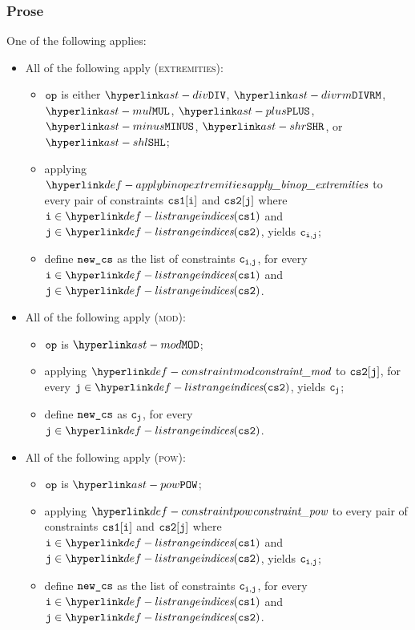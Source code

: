 \subsubsection{Prose}
One of the following applies:
\begin{itemize}
  \item All of the following apply (\textsc{extremities}):
  \begin{itemize}
    \item $\texttt{op}$ is either $\DIV$, $\DIVRM$, $\MUL$, $\PLUS$, $\MINUS$, $\SHR$, or $\SHL$;
    \item applying $\applybinopextremities$ to every pair of constraints $\texttt{cs1}[\texttt{i}]$ and $\texttt{cs2}[\texttt{j}]$
          where $\vi\in\listrange(\csone)$ and $\vj\in\listrange(\cstwo)$, yields $\texttt{c}_{\texttt{i},\texttt{j}}$;
    \item define $\texttt{new\_cs}$ as the list of constraints $\texttt{c}_{\texttt{i},\texttt{j}}$, for every
          $\vi\in\listrange(\csone)$ and $\vj\in\listrange(\cstwo)$.
  \end{itemize}

  \item All of the following apply (\textsc{mod}):
  \begin{itemize}
    \item $\texttt{op}$ is $\MOD$;
    \item applying $\constraintmod$ to $\texttt{cs2}[\texttt{j}]$, for every $\vj\in\listrange(\cstwo)$, yields $\texttt{c}_{\texttt{j}}$;
    \item define $\texttt{new\_cs}$ as $\texttt{c}_{\texttt{j}}$, for every $\vj\in\listrange(\cstwo)$.
  \end{itemize}

  \item All of the following apply (\textsc{pow}):
  \begin{itemize}
    \item $\texttt{op}$ is $\POW$;
    \item applying $\constraintpow$ to every pair of constraints $\texttt{cs1}[\texttt{i}]$ and $\texttt{cs2}[\texttt{j}]$
          where $\vi\in\listrange(\csone)$ and $\vj\in\listrange(\cstwo)$, yields $\texttt{c}_{\texttt{i},\texttt{j}}$;
    \item define $\texttt{new\_cs}$ as the list of constraints $\texttt{c}_{\texttt{i},\texttt{j}}$, for every
          $\vi\in\listrange(\csone)$ and $\vj\in\listrange(\cstwo)$.
  \end{itemize}
\end{itemize}

